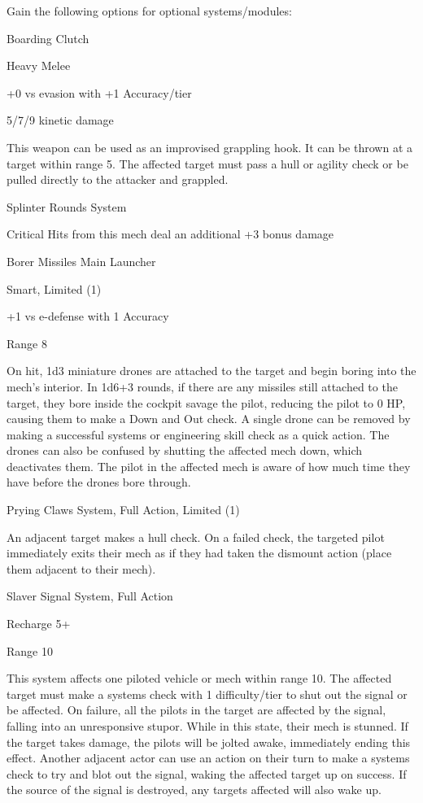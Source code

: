 Gain the following options for optional systems/modules:
 

Boarding Clutch
 
Heavy Melee
 
+0 vs evasion with +1 Accuracy/tier
 
5/7/9 kinetic damage
 
This weapon can be used as an improvised grappling hook. It can be thrown at a target within  
range 5. The affected target must pass a hull or agility check or be pulled directly to the attacker  
and grappled.
 

Splinter Rounds  
System
 
Critical Hits from this mech deal an additional +3 bonus damage
 

Borer Missiles  
Main Launcher
 

                                                                                                              


Smart, Limited (1)
 
+1 vs e-defense with 1 Accuracy
 
Range 8
 
On hit, 1d3 miniature drones are attached to the target and begin boring into the mech’s interior.  
In 1d6+3 rounds, if there are any missiles still attached to the target, they bore inside the cockpit  
savage the pilot, reducing the pilot to 0 HP, causing them to make a Down and Out check. A  
single drone can be removed by making a successful systems or engineering skill check as a  
quick action. The drones can also be confused by shutting the affected mech down, which  
deactivates them. The pilot in the affected mech is aware of how much time they have before the  
drones bore through.
 

Prying Claws  
System, Full Action, Limited (1)
 
An adjacent target makes a hull check. On a failed check, the targeted pilot immediately exits  
their mech as if they had taken the dismount action (place them adjacent to their mech).
 

Slaver Signal  
System, Full Action
 
Recharge 5+
 
Range 10
 
This system affects one piloted vehicle or mech within range 10. The affected target must make  
a systems check with 1 difficulty/tier to shut out the signal or be affected. On failure, all the pilots  
in the target are affected by the signal, falling into an unresponsive stupor. While in this state,  
their mech is stunned. If the target takes damage, the pilots will be jolted awake, immediately  
ending this effect. Another adjacent actor can use an action on their turn to make a systems  
check to try and blot out the signal, waking the affected target up on success. If the source of  
the signal is destroyed, any targets affected will also wake up.
 
